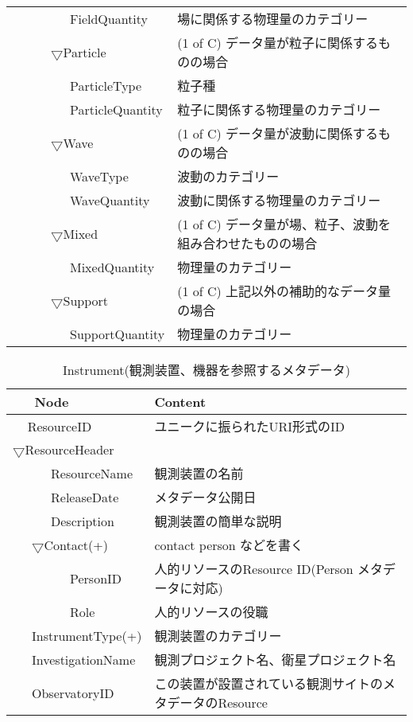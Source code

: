\begin{table}[ht]
\begin{center}
{\begin{tabular}{ll}
\ \ \ \ \ \ \ \ \ FieldQuantity & 場に関係する物理量のカテゴリー\\
\ \ \ \ \ \ $\bigtriangledown$Particle & (1 of C) データ量が粒子に関係するものの場合\\
\ \ \ \ \ \ \ \ \ ParticleType & 粒子種\\
\ \ \ \ \ \ \ \ \ ParticleQuantity & 粒子に関係する物理量のカテゴリー\\
\ \ \ \ \ \ $\bigtriangledown$Wave & (1 of C) データ量が波動に関係するものの場合\\
\ \ \ \ \ \ \ \ \ WaveType & 波動のカテゴリー\\
\ \ \ \ \ \ \ \ \ WaveQuantity & 波動に関係する物理量のカテゴリー\\
\ \ \ \ \ \ $\bigtriangledown$Mixed & (1 of C) データ量が場、粒子、波動を組み合わせたものの場合\\
\ \ \ \ \ \ \ \ \ MixedQuantity & 物理量のカテゴリー\\
\ \ \ \ \ \ $\bigtriangledown$Support & (1 of C) 上記以外の補助的なデータ量の場合\\
\ \ \ \ \ \ \ \ \ SupportQuantity & 物理量のカテゴリー\\ \hline
\end{tabular}
}
\end{center}
\end{table}

\begin{table}[ht]
\begin{center}
{\scriptsize
\caption{Instrument(観測装置、機器を参照するメタデータ)}
\begin{tabular}{ll}\hline
\ \ \ Node & Content \\ \hline
\ \ \,ResourceID & ユニークに振られたURI形式のID\\
$\bigtriangledown$ResourceHeader & \\
\ \ \ \ \ \ ResourceName & 観測装置の名前\\
\ \ \ \ \ \ ReleaseDate & メタデータ公開日\\
\ \ \ \ \ \ Description & 観測装置の簡単な説明\\
\ \ \ $\bigtriangledown$Contact(+) & contact person などを書く\\
\ \ \ \ \ \ \ \ \ PersonID & 人的リソースのResource ID(Person メタデータに対応)\\
\ \ \ \ \ \ \ \ \ Role & 人的リソースの役職\\
\ \ \ InstrumentType(+) & 観測装置のカテゴリー\\
\ \ \ InvestigationName & 観測プロジェクト名、衛星プロジェクト名\\
\ \ \ ObservatoryID & この装置が設置されている観測サイトのメタデータのResource\\ \hline
\end{tabular}
}
\end{center}
\end{table}

